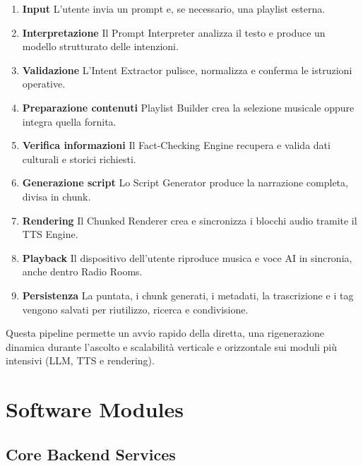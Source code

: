 \documentclass[11pt,a4paper]{article}
\begin{document}
\begin{enumerate}
    \item \textbf{Input}  
    L’utente invia un prompt e, se necessario, una playlist esterna.

    \item \textbf{Interpretazione}  
    Il Prompt Interpreter analizza il testo e produce un modello strutturato delle intenzioni.

    \item \textbf{Validazione}  
    L’Intent Extractor pulisce, normalizza e conferma le istruzioni operative.

    \item \textbf{Preparazione contenuti}  
    Playlist Builder crea la selezione musicale oppure integra quella fornita.

    \item \textbf{Verifica informazioni}  
    Il Fact-Checking Engine recupera e valida dati culturali e storici richiesti.

    \item \textbf{Generazione script}  
    Lo Script Generator produce la narrazione completa, divisa in chunk.

    \item \textbf{Rendering}  
    Il Chunked Renderer crea e sincronizza i blocchi audio tramite il TTS Engine.

    \item \textbf{Playback}  
    Il dispositivo dell’utente riproduce musica e voce AI in sincronia, anche dentro Radio Rooms.

    \item \textbf{Persistenza}  
    La puntata, i chunk generati, i metadati, la trascrizione e i tag vengono salvati per riutilizzo, ricerca e condivisione.
\end{enumerate}

Questa pipeline permette un avvio rapido della diretta, una rigenerazione dinamica durante l’ascolto e scalabilità verticale e orizzontale sui moduli più intensivi (LLM, TTS e rendering).
\section{Software Modules}

\subsection{Core Backend Services}
\end{document}

